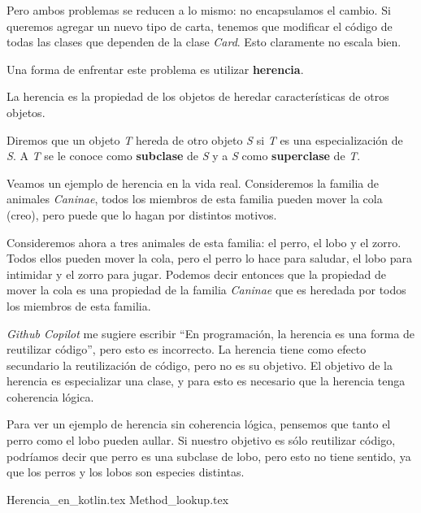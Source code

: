   Pero ambos problemas se reducen a lo mismo: no encapsulamos el cambio.
  Si queremos agregar un nuevo tipo de carta, tenemos que modificar el código de todas las clases
  que dependen de la clase \textit{Card}.
  Esto claramente no escala bien.

  Una forma de enfrentar este problema es utilizar \textbf{herencia}.

  \begin{defaultbox}[Herencia]
    La herencia es la propiedad de los objetos de heredar características de otros objetos.
    
    Diremos que un objeto \textit{T} hereda de otro objeto \textit{S} si \textit{T} es una
    especialización de \textit{S}.
    A \textit{T} se le conoce como \textbf{subclase} de \textit{S} y a \textit{S} como
    \textbf{superclase} de \textit{T}.
  \end{defaultbox}

  Veamos un ejemplo de herencia en la vida real.
  Consideremos la familia de animales \textit{Caninae}, todos los miembros de esta familia pueden
  mover la cola (creo), pero puede que lo hagan por distintos motivos.
  
  Consideremos ahora a tres animales de esta familia: el perro, el lobo y el zorro.
  Todos ellos pueden mover la cola, pero el perro lo hace para saludar, el lobo para intimidar y
  el zorro para jugar.
  Podemos decir entonces que la propiedad de mover la cola es una propiedad de la familia 
  \textit{Caninae} que es heredada por todos los miembros de esta familia.

  \textit{Github Copilot} me sugiere escribir \enquote{En programación, la herencia es una forma de 
  reutilizar código}, pero esto es incorrecto.
  La herencia tiene como efecto secundario la reutilización de código, pero no es su objetivo.
  El objetivo de la herencia es especializar una clase, y para esto es necesario que la herencia 
  tenga coherencia lógica.

  Para ver un ejemplo de herencia sin coherencia lógica, pensemos que tanto el perro como el lobo
  pueden aullar.
  Si nuestro objetivo es sólo reutilizar código, podríamos decir que perro es una subclase de lobo,
  pero esto no tiene sentido, ya que los perros y los lobos son especies distintas.

  {Herencia_en_kotlin.tex}
  {Method_lookup.tex}